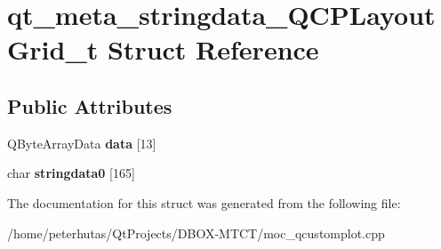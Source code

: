 \hypertarget{structqt__meta__stringdata___q_c_p_layout_grid__t}{}\section{qt\+\_\+meta\+\_\+stringdata\+\_\+\+Q\+C\+P\+Layout\+Grid\+\_\+t Struct Reference}
\label{structqt__meta__stringdata___q_c_p_layout_grid__t}
\subsection*{Public Attributes}
\begin{DoxyCompactItemize}
\item 
\mbox{\label{structqt__meta__stringdata___q_c_p_layout_grid__t_ab9a2518e0da08ddfb279fb649cdec091}} 
Q\+Byte\+Array\+Data {\bfseries data} \mbox{[}13\mbox{]}
\item 
\mbox{\label{structqt__meta__stringdata___q_c_p_layout_grid__t_a0592c486ce0adf2a3a83670727f00df2}} 
char {\bfseries stringdata0} \mbox{[}165\mbox{]}
\end{DoxyCompactItemize}


The documentation for this struct was generated from the following file\+:\begin{DoxyCompactItemize}
\item 
/home/peterhutas/\+Qt\+Projects/\+D\+B\+O\+X-\/\+M\+T\+C\+T/moc\+\_\+qcustomplot.\+cpp\end{DoxyCompactItemize}
